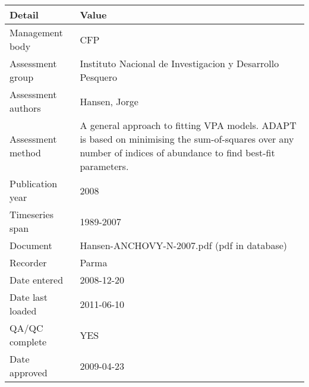 \begin{table}[htb]
\centering
\begin{tabular}{lp{7cm}}
\toprule
Detail & Value \\
\midrule
Management body    & CFP                                                                                                                                                            \\
Assessment group   & Instituto Nacional de Investigacion y Desarrollo Pesquero                                                                                                      \\
Assessment authors & Hansen, Jorge                                                                                                                                                  \\
Assessment method  & A general approach to fitting VPA models. ADAPT is based on minimising the sum-of-squares over any number of indices of abundance to find best-fit parameters. \\
Publication year   & 2008                                                                                                                                                           \\
Timeseries span    & 1989-2007                                                                                                                                                      \\
Document           & Hansen-ANCHOVY-N-2007.pdf (pdf in database)                                                                                                                    \\
Recorder           & Parma                                                                                                                                                          \\
Date entered       & 2008-12-20                                                                                                                                                     \\
Date last loaded   & 2011-06-10                                                                                                                                                     \\
QA/QC complete     & YES                                                                                                                                                            \\
Date approved      & 2009-04-23                                                                                                                                                     \\
\bottomrule
\end{tabular}
\label{tab:assessdet}
\end{table}

